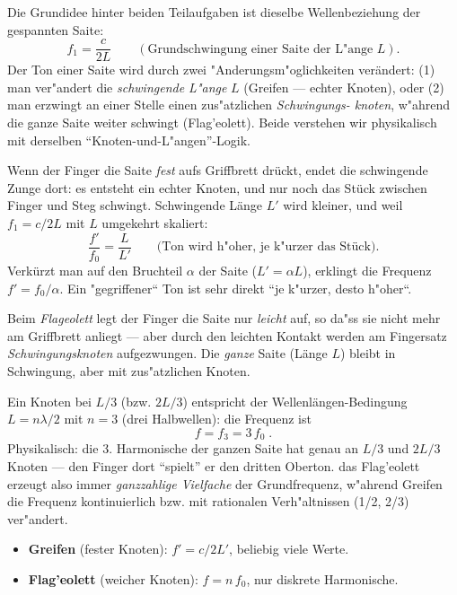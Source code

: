 

Die Grundidee hinter beiden Teilaufgaben ist dieselbe Wellenbeziehung der 
gespannten Saite:
\begin{equation}
  f_1=\frac{c}{2L}\qquad(\text{Grundschwingung einer Saite der L"ange }L).
\end{equation}
Der Ton einer Saite wird durch zwei "Anderungsm"oglichkeiten verändert: (1)
man ver"andert die \emph{schwingende L"ange} $L$ (Greifen --- echter Knoten),
oder (2) man erzwingt an einer Stelle einen zus"atzlichen \emph{Schwingungs-
knoten}, w"ahrend die ganze Saite weiter schwingt (Flag'eolett). Beide
verstehen wir physikalisch mit derselben ``Knoten-und-L"angen''-Logik.

\begin{werkzeugkasten}
Wenn der Finger die Saite \emph{fest} aufs Griffbrett drückt, endet die
schwingende Zunge dort: es entsteht ein echter Knoten, und nur noch das
Stück zwischen Finger und Steg schwingt. Schwingende Länge $L'$ wird kleiner,
und weil $f_1=c/2L$ mit $L$ umgekehrt skaliert:
\begin{equation}
  \frac{f'}{f_0}=\frac{L}{L'}\qquad
  \text{(Ton wird h"oher, je k"urzer das Stück)}.
\end{equation}
Verkürzt man auf den Bruchteil $\alpha$ der Saite ($L'=\alpha L$), erklingt
die Frequenz $f'=f_0/\alpha$. Ein "gegriffener`` Ton ist sehr direkt ``je
k"urzer, desto h"oher``.
\end{werkzeugkasten}

\begin{werkzeugkasten}
Beim \emph{Flageolett} legt der Finger die Saite nur \emph{leicht} auf, so
da"ss sie nicht mehr am Griffbrett anliegt --- aber durch den leichten Kontakt
werden am Fingersatz \emph{Schwingungsknoten} aufgezwungen. Die \emph{ganze}
Saite (Länge $L$) bleibt in Schwingung, aber mit zus"atzlichen Knoten.

Ein Knoten bei $L/3$ (bzw. $2L/3$) entspricht der Wellenlängen-Bedingung
$L=n\lambda/2$ mit $n=3$ (drei Halbwellen): die Frequenz ist
\begin{equation}
  f=f_3=3\,f_0\;.
\end{equation}
Physikalisch: die 3. Harmonische der ganzen Saite hat genau an $L/3$ und
$2L/3$ Knoten --- den Finger dort ``spielt'' er den dritten Oberton. das
Flag'eolett erzeugt also immer \emph{ganzzahlige Vielfache} der
Grundfrequenz, w"ahrend Greifen die Frequenz kontinuierlich bzw. mit
rationalen Verh"altnissen (1/2, 2/3) ver"andert.

\begin{itemize}
  \item \textbf{Greifen} (fester Knoten): $f'=c/2L'$, beliebig viele Werte.
  \item \textbf{Flag'eolett} (weicher Knoten): $f=n\,f_0$, nur diskrete
        Harmonische.
\end{itemize}
\end{werkzeugkasten}

